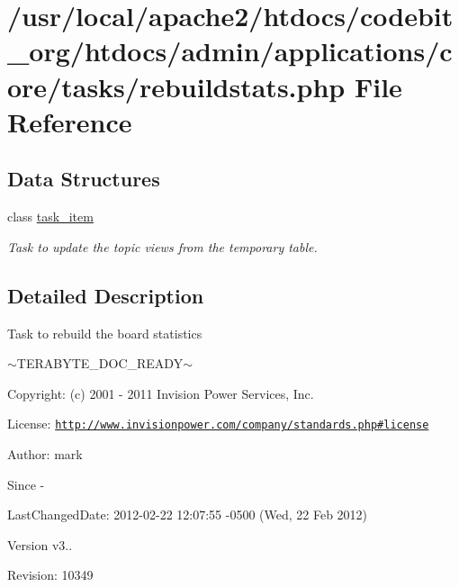 \hypertarget{rebuildstats_8php}{\section{/usr/local/apache2/htdocs/codebit\-\_\-org/htdocs/admin/applications/core/tasks/rebuildstats.php File Reference}
\label{rebuildstats_8php}
}
\subsection*{Data Structures}
\begin{DoxyCompactItemize}
\item 
class \hyperlink{classtask__item}{task\-\_\-item}
\begin{DoxyCompactList}\small\item\em Task to update the topic views from the temporary table. \end{DoxyCompactList}\end{DoxyCompactItemize}


\subsection{Detailed Description}
\begin{DoxyVerb}  Task to rebuild the board statistics
\end{DoxyVerb}
 $\sim$\-T\-E\-R\-A\-B\-Y\-T\-E\-\_\-\-D\-O\-C\-\_\-\-R\-E\-A\-D\-Y$\sim$ \begin{DoxyParagraph}{Copyright\-:}
(c) 2001 -\/ 2011 Invision Power Services, Inc.
\end{DoxyParagraph}
\begin{DoxyParagraph}{License\-:}
\href{http://www.invisionpower.com/company/standards.php#license}{\tt http\-://www.\-invisionpower.\-com/company/standards.\-php\#license}
\end{DoxyParagraph}
\begin{DoxyParagraph}{Author\-:}
mark 
\end{DoxyParagraph}
\begin{DoxySince}{Since}
-\/ 
\end{DoxySince}
\begin{DoxyParagraph}{Last\-Changed\-Date\-:}
2012-\/02-\/22 12\-:07\-:55 -\/0500 (Wed, 22 Feb 2012) 
\end{DoxyParagraph}
\begin{DoxyVersion}{Version}
v3.. 
\end{DoxyVersion}
\begin{DoxyParagraph}{Revision\-:}
10349 
\end{DoxyParagraph}
